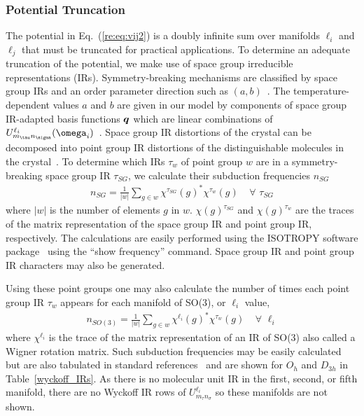 \documentclass[preprint]{iucr}              %
\newcommand{\mb}[1]{\ensuremath{\mbox{\boldmath $ #1 $}}}
\begin{document}
\subsubsection{Potential Truncation}
\label{truncation}

The potential in Eq.~(\ref{re:eq:vij2}) is a doubly infinite sum over
manifolds $\ell_i$ and $\ell_j$ that must be truncated for practical
applications. To determine an adequate truncation of the potential, we
make use of space group irreducible representations (IRs).
Symmetry-breaking mechanisms are classified by space group IRs and
an order parameter direction such as $(a,b)$~\cite{Stokes07}.  The
temperature-dependent values $a$ and $b$ are given in our model by
components of space group IR-adapted basis functions $\mb{q}$ which
are linear combinations of $U^{\ell_i}_{m_\tau
n_\sigma}(\mb{\omega}_i)$~\cite{Mettes04}. Space group IR
distortions of the crystal can be decomposed into point group IR
distortions of the distinguishable molecules in the
crystal~\cite{Stokes91}. To determine which IRs $\tau_w$ of point
group $w$ are in a symmetry-breaking space group IR $\tau_{SG}$, we
calculate their subduction frequencies $n_{SG}$
\begin{eqnarray}
\label{subduction1} n_{SG}=\frac{1}{|w|}\sum_{g\in
w}\chi^{\tau_{SG}}(g)^*\chi^{\tau_w}(g)\;\;\;\;\forall\,\,\tau_{SG}
\end{eqnarray}
where $|w|$ is the number of elements $g$ in $w$.
$\chi(g)^{\tau_{SG}}$ and $\chi(g)^{\tau_w}$ are the traces of the
matrix representation of the space group IR and point group IR,
respectively. The calculations are easily performed using the
{I\small SOTROPY} software package~\cite{Stokes07} using the ``show
frequency'' command. Space group IR and point group IR characters
may also be generated.

Using these point groups one may also calculate the number of times
each point group IR $\tau_w$ appears for each manifold of SO(3), or
$\ell_i$ value,
\begin{eqnarray}
\label{subduction2} n_{SO(3)}=\frac{1}{|w|}\sum_{g\in
w}\chi^{\ell_i}(g)^*\chi^{\tau_w}(g)\;\;\;\;\forall\,\,\ell_i
\end{eqnarray}
where $\chi^{\ell_i}$ is the trace of the matrix representation of
an IR of SO(3) also called a Wigner rotation matrix. Such subduction
frequencies may be easily calculated but are also tabulated in
standard references~\cite{Bradley72} and are shown for
$O_h$ and $D_{3h}$ in Table~\ref{wyckoff_IRs}.  As there is no
molecular unit IR in the first, second, or fifth manifold, there are
no Wyckoff IR rows of $U^{\ell_i}_{m_\tau n_\sigma}$ so these
manifolds are not shown.
\end{document}
